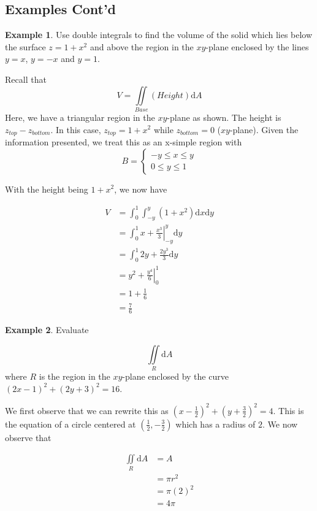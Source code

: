 \documentclass[11pt]{article}
\theoremstyle{plain} %
\theoremstyle{definition}
\theoremstyle{example}
\newtheorem*{example}{Example}
\theoremstyle{remark}
\begin{document}
\subsection{Examples Cont'd}
\begin{example}

Use double integrals to find the volume of the solid which lies below the surface $z=1+x^2$ and above the region in the $xy$-plane enclosed by the lines $y=x$, $y=-x$ and $y=1$. 
\end{example}

Recall that $$V = \iint\limits_{Base} (Height)\mathrm d A$$
Here, we have a triangular region in the $xy$-plane as shown. The height is $z_{top}-z_{bottom}$. In this case, $z_{top} = 1+x^2$ while $z_{bottom} = 0$ ($xy$-plane). Given the information presented, we treat this as an x-simple region with 
$$B = \begin{cases}
-y \leq x \leq y\\
0 \leq y \leq 1
\end{cases}$$

With the height being $1+x^2$, we now have 

\begin{align*}
	V &= \int_0^1 \int_{-y}^y \left(1+x^2\right)\mathrm d x \mathrm d y\\
	&= \int_0^1 \left.x+\frac{x^3}{3}\right|_{-y}^y\mathrm d y\\
	&= \int_0^1 2y+\frac{2y^3}{3} \mathrm d y\\
	&= \left.y^2+\frac{y^4}{6}\right|_0^1\\
	&= 1 + \frac{1}{6}\\
	&= \frac{7}{6}
\end{align*}

\begin{example}
Evaluate 

$$\iint\limits_R\mathrm d A$$ where $R$ is the region in the $xy$-plane enclosed by the curve $(2x-1)^2+(2y+3)^2=16$. 
\end{example}

We first observe that we can rewrite this as $\left(x-\frac{1}{2}\right)^2+\left(y+\frac{3}{2}\right)^2=4$. This is the equation of a circle centered at $\left(\frac{1}{2}, -\frac{3}{2}\right)$ which has a radius of $2$. We now observe that 

\begin{align*}
\iint\limits_R\mathrm d A &= A\\
&= \pi r^2\\
&= \pi (2)^2\\
&= 4\pi
\end{align*}
\end{document}
